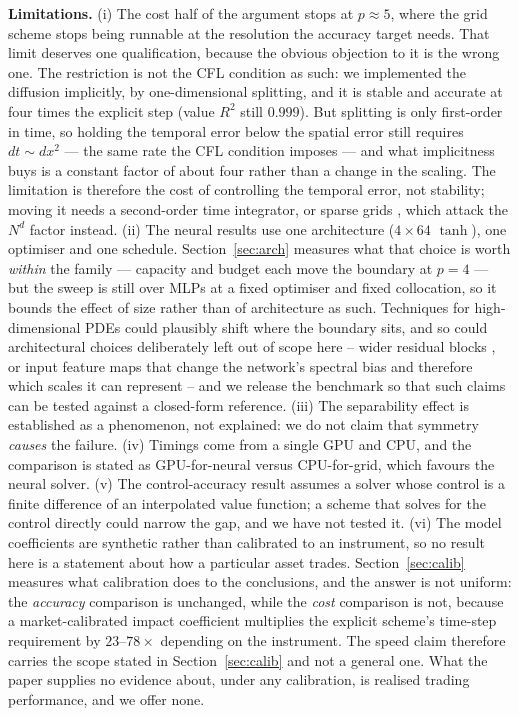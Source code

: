 \documentclass[conference]{IEEEtran}
\begin{document}
\textbf{Limitations.} (i) The cost half of the argument stops at $p \approx 5$, where the grid
scheme stops being runnable at the resolution the accuracy target needs. That limit deserves one
qualification, because the obvious objection to it is the wrong one. The restriction is not the CFL
condition as such: we implemented the diffusion implicitly, by one-dimensional splitting, and it is
stable and accurate at four times the explicit step (value $R^2$ still $0.999$). But splitting is
only first-order in time, so holding the temporal error below the spatial error still requires
$dt \sim dx^2$ --- the same rate the CFL condition imposes --- and what implicitness buys is a
constant factor of about four rather than a change in the scaling. The limitation is therefore the
cost of controlling the temporal error, not stability; moving it needs a second-order time
integrator, or sparse grids \cite{bungartz2004sparse}, which attack the $N^d$ factor instead. (ii) The neural results use one
architecture ($4\times64$ $\tanh$), one optimiser and one schedule. Section~\ref{sec:arch} measures
what that choice is worth \emph{within} the family --- capacity and budget each move the boundary at
$p=4$ --- but the sweep is still over MLPs at a fixed optimiser and fixed collocation, so it bounds
the effect of size rather than of architecture as such. Techniques for high-dimensional PDEs
\cite{meng2020ppinn,moseley2021finite} could plausibly shift where the boundary sits, and so could
architectural choices deliberately left out of scope here -- wider
residual blocks \cite{zagoruyko2016wide}, or input feature maps that change the network's spectral
bias and therefore which scales it can represent \cite{wang2020understanding} -- and we release the
benchmark so that such claims can be tested against a closed-form
reference. (iii) The separability effect is established as a phenomenon, not explained: we do not
claim that symmetry \emph{causes} the failure. (iv) Timings come from a single GPU and CPU, and the
comparison is stated as GPU-for-neural versus CPU-for-grid, which favours the neural solver. (v) The
control-accuracy result assumes a solver whose control is a finite difference of an interpolated
value function; a scheme that solves for the control directly could narrow the gap, and we have not
tested it. (vi) The model coefficients are synthetic rather than calibrated to an instrument, so no
result here is a statement about how a particular asset trades. Section~\ref{sec:calib} measures what
calibration does to the conclusions, and the answer is not uniform: the \emph{accuracy} comparison is
unchanged, while the \emph{cost} comparison is not, because a market-calibrated impact coefficient
multiplies the explicit scheme's time-step requirement by $23$--$78\times$ depending on the
instrument. The speed claim therefore carries the scope stated in Section~\ref{sec:calib} and not a
general one. What the paper supplies no evidence about, under any calibration, is realised trading
performance, and we offer none.
\end{document}
